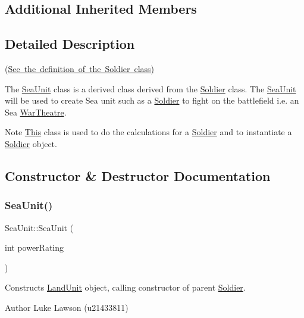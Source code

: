 \subsection*{Additional Inherited Members}


\subsection{Detailed Description}
\mbox{\hyperlink{_soldier_8h_source}{(See the definition of the Soldier class)}}

The \mbox{\hyperlink{class_sea_unit}{Sea\+Unit}} class is a derived class derived from the \mbox{\hyperlink{class_soldier}{Soldier}} class. The \mbox{\hyperlink{class_sea_unit}{Sea\+Unit}} will be used to create Sea unit such as a \mbox{\hyperlink{class_soldier}{Soldier}} to fight on the battlefield i.\+e. an Sea \mbox{\hyperlink{class_war_theatre}{War\+Theatre}}. \begin{DoxyNote}{Note}
\mbox{\hyperlink{class_this}{This}} class is used to do the calculations for a \mbox{\hyperlink{class_soldier}{Soldier}} and to instantiate a \mbox{\hyperlink{class_soldier}{Soldier}} object. 
\end{DoxyNote}


\subsection{Constructor \& Destructor Documentation}
\mbox{\label{class_sea_unit_aec91d0cb64b9d4f89a352d68397038b0}} 
\subsubsection{\texorpdfstring{SeaUnit()}{SeaUnit()}}
{\footnotesize\ttfamily Sea\+Unit\+::\+Sea\+Unit (\begin{DoxyParamCaption}\item[{int}]{power\+Rating }\end{DoxyParamCaption})}



Constructs \mbox{\hyperlink{class_land_unit}{Land\+Unit}} object, calling constructor of parent \mbox{\hyperlink{class_soldier}{Soldier}}. 

\begin{DoxyAuthor}{Author}
Luke Lawson (u21433811) 
\end{DoxyAuthor}

